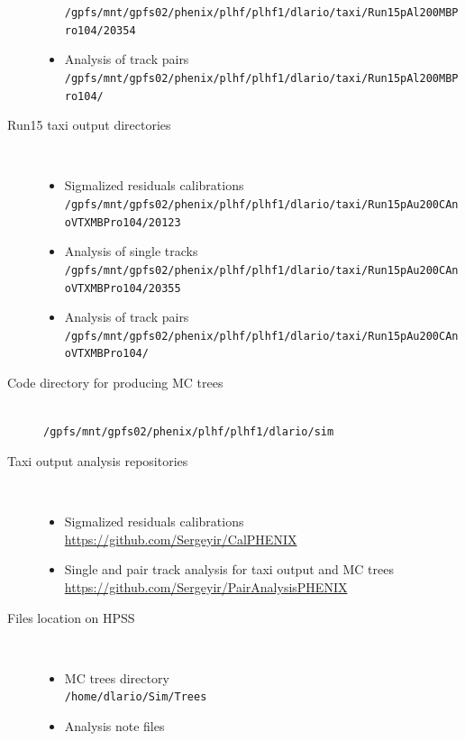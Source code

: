 \begin{description}
\begin{itemize}
               \texttt{/gpfs/mnt/gpfs02/phenix/plhf/plhf1/dlario/taxi/Run15pAl200MBPro104/20354}
            \item{Analysis of track pairs} \\
               \texttt{/gpfs/mnt/gpfs02/phenix/plhf/plhf1/dlario/taxi/Run15pAl200MBPro104/\color{red}{??}}
         \end{itemize}
      \item[Run15 \pAu taxi output directories]~
         \begin{itemize}
            \item{Sigmalized residuals calibrations} \\
               \texttt{/gpfs/mnt/gpfs02/phenix/plhf/plhf1/dlario/taxi/Run15pAu200CAnoVTXMBPro104/20123}
            \item{Analysis of single tracks} \\
               \texttt{/gpfs/mnt/gpfs02/phenix/plhf/plhf1/dlario/taxi/Run15pAu200CAnoVTXMBPro104/20355}
            \item{Analysis of track pairs} \\
               \texttt{/gpfs/mnt/gpfs02/phenix/plhf/plhf1/dlario/taxi/Run15pAu200CAnoVTXMBPro104/\color{red}{??}}
         \end{itemize}
      \item[Code directory for producing MC trees]~\\
         \texttt{/gpfs/mnt/gpfs02/phenix/plhf/plhf1/dlario/sim}
      \item[Taxi output analysis repositories]~
         \begin{itemize}
            \item{Sigmalized residuals calibrations} \\
               \url{https://github.com/Sergeyir/CalPHENIX}
            \item{Single and pair track analysis for taxi output and MC trees} \\
               \url{https://github.com/Sergeyir/PairAnalysisPHENIX} 
         \end{itemize}
      \item[Files location on HPSS]~
         \begin{itemize}
            \item{MC trees directory} \\
               \texttt{/home/dlario/Sim/Trees} 
            \item{Analysis note files} \\
               \texttt{\color{red}{??}}%

\end{itemize}
\end{description}

